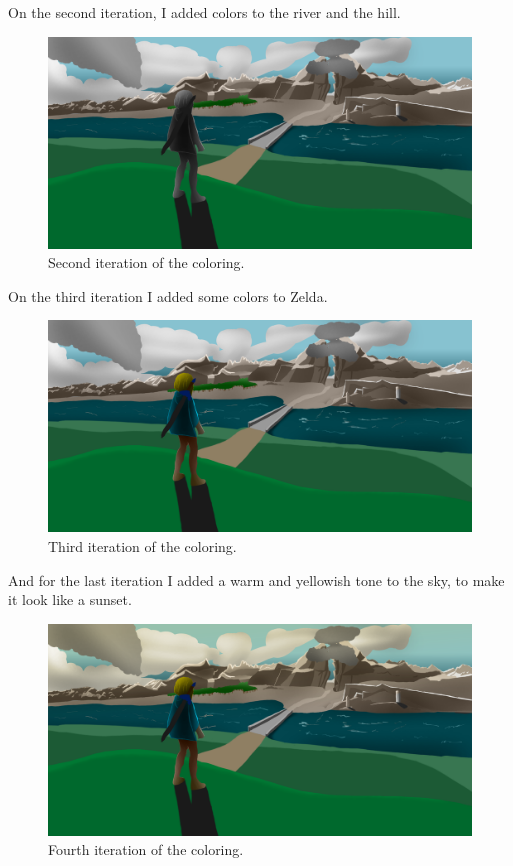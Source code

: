 \documentclass{cup-pan}
\begin{document}
        On the second iteration, I added colors to the river and the hill. 
        \begin{figure}[H]
            \includegraphics[width=\textwidth]{Imagenes/Fanart1/Color/II_Iteracion.png}
            \caption{Second iteration of the coloring.}
        \end{figure}

        On the third iteration I added some colors to Zelda. 
        \begin{figure}[H]
            \includegraphics[width=\textwidth]{Imagenes/Fanart1/Color/III_Iteracion.png}
            \caption{Third iteration of the coloring.}
        \end{figure}

        And for the last iteration I added a warm and yellowish tone to the sky, to make it look like a sunset.\\
        \begin{figure}[H]
            \includegraphics[width=\textwidth]{Imagenes/Fanart1/Color/IIII_Iteracion.png}
            \caption{Fourth iteration of the coloring.}
        \end{figure}
        
\end{document}
